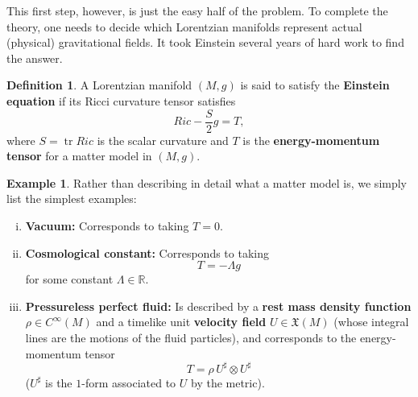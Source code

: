 \documentclass[10pt]{amsart}
\newcommand{\bbR}{\mathbb{R}}      %
\newcommand{\tr}{\operatorname{tr}}
\newcommand{\cX}{\mathfrak{X}}
\theoremstyle{definition}
\newtheorem{Def}[Thm]{Definition}
\newtheorem{Example}[Thm]{Example}
\theoremstyle{remark}
\begin{document}
This first step, however, is just the easy half of the problem. To complete the theory, one needs to decide which Lorentzian manifolds represent actual (physical) gravitational fields. It took Einstein several years of hard work to find the answer.

\begin{Def}
A Lorentzian manifold $(M,g)$ is said to satisfy the {\bf Einstein equation} if its Ricci curvature tensor satisfies
\[
Ric - \frac{S}2 g = T,
\]
where $S = \tr Ric$ is the scalar curvature and $T$ is the {\bf energy-momentum tensor} for a matter model in $(M,g)$.
\end{Def}

\begin{Example} \label{matter}
Rather than describing in detail what a matter model is, we simply list the simplest examples:
\begin{enumerate}[(i)]
\item
{\bf Vacuum:} Corresponds to taking $T=0$.
\item
{\bf Cosmological constant:} Corresponds to taking
\[
T = -\Lambda g
\]
for some constant $\Lambda \in \bbR$.
\item
{\bf Pressureless perfect fluid:} Is described by a {\bf rest mass density function} $\rho \in C^\infty(M)$ and a timelike unit {\bf velocity field} $U \in \cX(M)$ (whose integral lines are the motions of the fluid particles), and corresponds to the energy-momentum tensor
\[
T = \rho \, U^\sharp \otimes U^\sharp 
\]
($U^\sharp$ is the $1$-form associated to $U$ by the metric).
\end{enumerate}
\end{Example}
\end{document}
